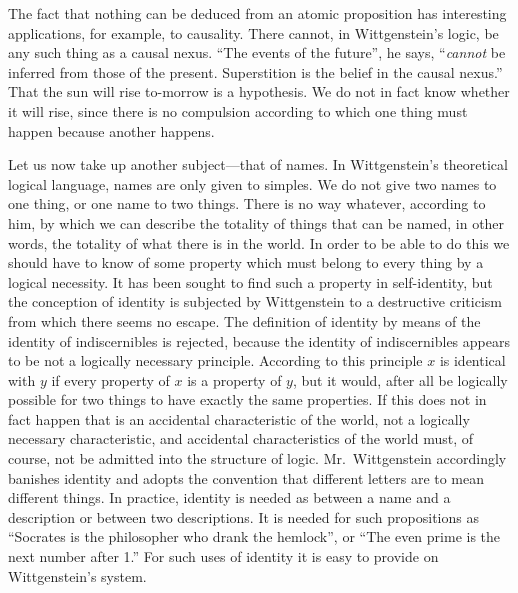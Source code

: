 The fact that nothing can be deduced from an atomic proposition has interesting applications, for example, to causality. There cannot, in Wittgenstein’s logic, be any such thing as a causal nexus. “The events of the future”, he says, “\emph{cannot} be inferred from those of the present. Superstition is the belief in the causal nexus.” That the sun will rise to-morrow is a hypothesis. We do not in fact know whether it will rise, since there is no compulsion according to which one thing must happen because another happens.

Let us now take up another subject—that of names. In Wittgenstein’s theoretical logical language, names are only given to simples. We do not give two names to one thing, or one name to two things. There is no way whatever, according to him, by which we can describe the totality of things that can be named, in other words, the totality of what there is in the world. In order to be able to do this we should have to know of some property which must belong to every thing by a logical necessity. It has been sought to find such a property in self-identity, but the conception of identity is subjected by Wittgenstein to a destructive criticism from which there seems no escape. The definition of identity by means of the identity of indiscernibles is rejected, because the identity of indiscernibles appears to be not a logically necessary principle. According to this principle $x$ is identical with $y$ if every property of $x$ is a property of $y$, but it would, after all be logically possible for two things to have exactly the same properties. If this does not in fact happen that is an accidental characteristic of the world, not a logically necessary characteristic, and accidental characteristics of the world must, of course, not be admitted into the structure of logic. Mr.\ Wittgenstein accordingly banishes identity and adopts the convention that different letters are to mean different things. In practice, identity is needed as between a name and a description or between two descriptions. It is needed for such propositions as “Socrates is the philosopher who drank the hemlock”, or “The even prime is the next number after 1.” For such uses of identity it is easy to provide on Wittgenstein’s system.

